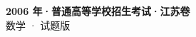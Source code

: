 \documentclass[zihao=-4, a4paper]{ctexart}
\begin{document}
\begin{center}
  {\Large\bfseries 2006 年·普通高等学校招生考试·江苏卷}\\[4pt]
  {\large 数学 · 试题版}
\end{center}
\medskip
{}

\end{document}
